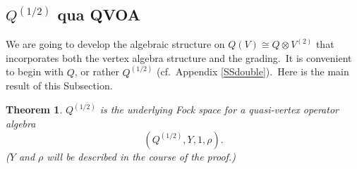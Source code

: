 \documentclass[12pt]{amsart}
\theoremstyle{plain}
\newtheorem{thm}{Theorem}[section]
\theoremstyle{definition}
\theoremstyle{remark}
\begin{document}
\subsection{\texorpdfstring{$Q^{(1/2)}$}{Q-halved} qua QVOA}

We are going to develop the algebraic structure on $Q(V)\cong Q\otimes V^{(2)}$ that incorporates both the vertex algebra structure and the grading.\ It is convenient to begin with $Q$, or rather $Q^{(1/2)}$ (cf.\ Appendix \ref{SSdouble}).\ Here is the main result of this Subsection.

\begin{thm}\label{thmQVA}
 $Q^{(1/2)}$ is the underlying Fock space for a quasi-vertex operator algebra $$(Q^{(1/2)}, Y, 1, \rho).$$  
 ($Y$ and $\rho$ will be described in the course of the proof.)
\end{thm}
\end{document}
